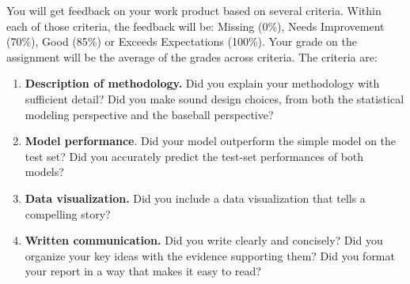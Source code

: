 \documentclass{article}
\begin{document}
      You will get feedback on your work product based on several criteria. Within each of those criteria, the feedback will be: Missing (0\%), Needs Improvement (70\%), Good (85\%) or Exceeds Expectations (100\%). Your grade on the assignment will be the average of the grades across criteria. The criteria are:
      \begin{enumerate}
        \item {\bf Description of methodology.} Did you explain your methodology with sufficient detail? Did you make sound design choices, from both the statistical modeling perspective and the baseball perspective?
        \item {\bf Model performance}. Did your model outperform the simple model on the test set? Did you accurately predict the test-set performances of both models?
        \item {\bf Data visualization.} Did you include a data visualization that tells a compelling story?
        \item {\bf Written communication.} Did you write clearly and concisely? Did you organize your key ideas with the evidence supporting them? Did you format your report in a way that makes it easy to read?
      \end{enumerate}
\end{document}
